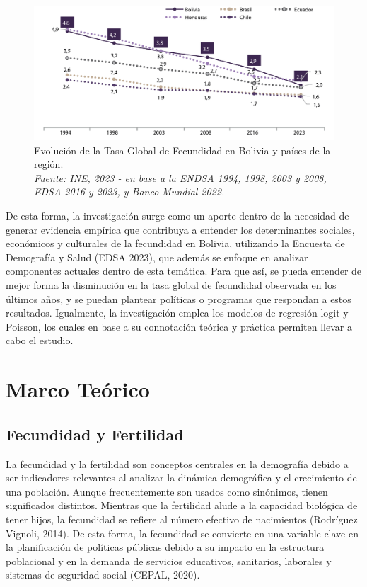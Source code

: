 \documentclass[Royal,times,sageh]{sagej}
\begin{document}
\begin{figure}

{\centering \includegraphics[width=1\linewidth]{imagenes/foto1} 

}

\caption{Evolución de la Tasa Global de Fecundidad en Bolivia y países de la región.\\\textit{Fuente: INE, 2023 - en base a la ENDSA 1994, 1998, 2003 y 2008, EDSA 2016 y 2023, y Banco Mundial 2022.}}\label{fig:unnamed-chunk-1}
\end{figure}

De esta forma, la investigación surge como un aporte dentro de la
necesidad de generar evidencia empírica que contribuya a entender los
determinantes sociales, económicos y culturales de la fecundidad en
Bolivia, utilizando la Encuesta de Demografía y Salud (EDSA 2023), que
además se enfoque en analizar componentes actuales dentro de esta
temática. Para que así, se pueda entender de mejor forma la disminución
en la tasa global de fecundidad observada en los últimos años, y se
puedan plantear políticas o programas que respondan a estos resultados.
Igualmente, la investigación emplea los modelos de regresión logit y
Poisson, los cuales en base a su connotación teórica y práctica permiten
llevar a cabo el estudio.

\section{Marco Teórico}\label{marco-teuxf3rico}

\subsection{Fecundidad y Fertilidad}\label{fecundidad-y-fertilidad}

La fecundidad y la fertilidad son conceptos centrales en la demografía
debido a ser indicadores relevantes al analizar la dinámica demográfica
y el crecimiento de una población. Aunque frecuentemente son usados como
sinónimos, tienen significados distintos. Mientras que la fertilidad
alude a la capacidad biológica de tener hijos, la fecundidad se refiere
al número efectivo de nacimientos (Rodríguez Vignoli, 2014). De esta
forma, la fecundidad se convierte en una variable clave en la
planificación de políticas públicas debido a su impacto en la estructura
poblacional y en la demanda de servicios educativos, sanitarios,
laborales y sistemas de seguridad social (CEPAL, 2020).
\end{document}
